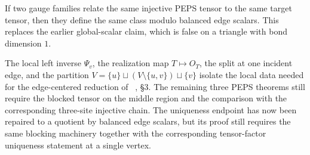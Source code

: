 \begin{theorem}%
    \label{thm:gauge_unique_mod_edge_scalars}
    \notready
    If two gauge families relate the same injective PEPS tensor to the same
    target tensor, then they define the same class modulo balanced edge
    scalars. This replaces the earlier global-scalar claim, which is false on
    a triangle with bond dimension $1$.
\end{theorem}

\begin{remark}
    The local left inverse $\Psi_v$, the realization map $T \mapsto O_T$,
    the split at one incident edge, and the partition
    $V = \{u\} \sqcup (V \setminus \{u,v\}) \sqcup \{v\}$ isolate the local
    data needed for the edge-centered reduction of
    ~\cite{Molnar2018NormalPEPS}, §3. The remaining three PEPS theorems still
    require the blocked tensor on the middle region and the comparison with the
    corresponding three-site injective chain. The uniqueness endpoint has now
    been repaired to a quotient by balanced edge scalars, but its proof still
    requires the same blocking machinery together with the corresponding
    tensor-factor uniqueness statement at a single vertex.
\end{remark}
